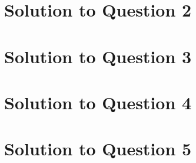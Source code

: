 \documentclass[11pt]{article}
\begin{document}
\section{Solution to Question 2}



\section{Solution to Question 3}



\section{Solution to Question 4}



\section{Solution to Question 5}
\end{document}
